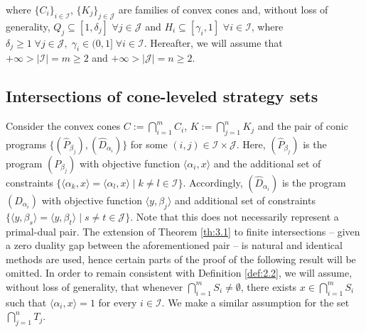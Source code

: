 \documentclass[11pt, twoside]{article}
\numberwithin{equation}{section}
\theoremstyle{definition}
\begin{document}
\noindent where $\{C_i\}_{i\in\mathcal{I}}$, $\{K_j\}_{j\in\mathcal{J}}$ are families of convex cones and, without loss of generality, $Q_j\subseteq [1,\delta_j]$ $\forall j\in\mathcal{J}$ and $H_i\subseteq[\gamma_i,1]$ $\forall i\in\mathcal{I}$, where $\delta_j\geq1\;\forall j\in\mathcal{J},\;\gamma_i\in(0,1]\;\forall i\in\mathcal{I}$. Hereafter, we will assume that $+\infty>|\mathcal{I}|=m\geq 2$ and $+\infty>|\mathcal{J}|=n\geq 2$. 


\vspace{-0.1cm}\subsection{Intersections of cone-leveled strategy sets}\label{sec:6.1}\vspace{-0.2cm}

Consider the convex cones $C:= \bigcap_{i=1}^{m}C_i$, $K:= \bigcap_{j=1}^{n}K_j$ and the pair of conic programs $\{(\widehat{P}_{\beta_j}),(\widehat{D}_{\alpha_{i}})\}$ for some $(i,j)\in\mathcal{I}\times\mathcal{J}$. Here, $(\widehat{P}_{\beta_j})$ is the program \hyperlink{primalbeta}{$(P_{\beta_{j}})$} with objective function $\langle\alpha_i,x\rangle$ and the additional set of constraints $\{\langle\alpha_k,x\rangle=\langle\alpha_l,x\rangle\;|\;k\neq l\in\mathcal{I}\}$. Accordingly, $(\widehat{D}_{\alpha_{i}})$ is the program \hyperlink{dualalpha}{$(D_{\alpha_{i}})$} with objective function $\langle y,\beta_j\rangle$ and additional set of constraints $\{\langle y,\beta_s\rangle=\langle y,\beta_t\rangle\;|\;s\neq t\in\mathcal{J}\}$. Note that this does not necessarily represent a primal-dual pair. The extension of Theorem \ref{th:3.1} to finite intersections -- given a zero duality gap between the aforementioned pair -- is natural and identical methods are used, hence certain parts of the proof of the following result will be omitted. In order to remain consistent with Definition \ref{def:2.2}, we will assume, without loss of generality, that whenever $\bigcap_{i=1}^{m}S_i\neq\emptyset$, there exists $x\in\bigcap_{i=1}^{m}S_i$ such that $\langle\alpha_i,x\rangle=1$ for every $i\in\mathcal{I}$. We make a similar assumption for the set $\bigcap_{j=1}^{n}T_j$.\quad\vspace{0.2cm}
\end{document}
